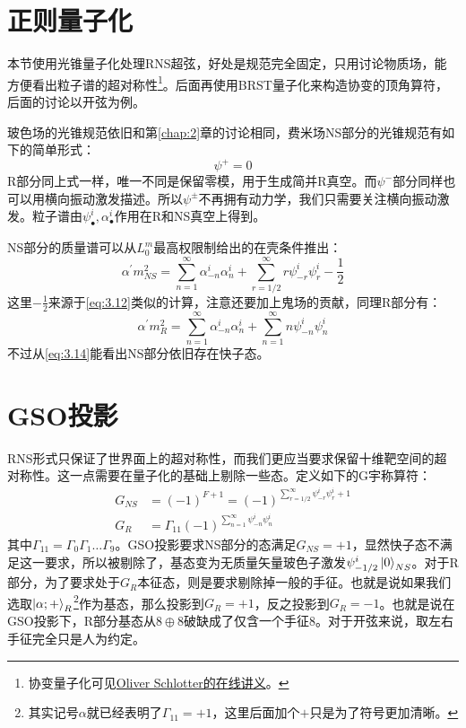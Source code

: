 \section{正则量子化}
本节使用光锥量子化处理RNS超弦，好处是规范完全固定，只用讨论物质场，能方便看出粒子谱的超对称性\footnote{协变量子化可见\href{https://www.uu.se/en/department/physics-and-astronomy/research/theoretical-physics/oliver-schlotterer}{Oliver Schlotter的在线讲义}。}。后面再使用BRST量子化来构造协变的顶角算符，后面的讨论以开弦为例。

玻色场的光锥规范依旧和第\ref{chap:2}章的讨论相同，费米场NS部分的光锥规范有如下的简单形式：
\begin{equation}
	\psi^+ = 0
\end{equation}
R部分同上式一样，唯一不同是保留零模，用于生成简并R真空。而$\psi^-$部分同样也可以用横向振动激发描述。所以$\psi^\pm$不再拥有动力学，我们只需要关注横向振动激发。粒子谱由$\psi^i_\bullet,\alpha^i_\bullet$作用在R和NS真空上得到。

NS部分的质量谱可以从$L_0^m$最高权限制给出的在壳条件推出：
\begin{equation}
	\label{eq:3.14}
	\alpha^{\prime}m^2_{NS}=\sum_{n=1}^\infty\alpha_{-n}^i\alpha_n^i+\sum_{r=1/2}^\infty r\psi_{-r}^i\psi_r^i-\frac{1}{2}
\end{equation}
这里$-\frac12$来源于\ref{eq:3.12}类似的计算，注意还要加上鬼场的贡献，同理R部分有：
\begin{equation}
	\alpha^{\prime}m^2_{R}=\sum_{n=1}^\infty\alpha_{-n}^i\alpha_n^i+\sum_{n=1}^\infty n\psi_{-n}^i \psi_n^i
\end{equation}
不过从\ref{eq:3.14}能看出NS部分依旧存在快子态。
\section{GSO投影}
RNS形式只保证了世界面上的超对称性，而我们更应当要求保留十维靶空间的超对称性。这一点需要在量子化的基础上剔除一些态。定义如下的G宇称算符：
\begin{equation}
\begin{aligned}
		G_{NS}&=(-1)^{F+1}=(-1)^{\sum_{r=1/2}^\infty \psi_{-r}^i\psi_r^i+1}\\
	G_R&=\Gamma_{11}(-1)^{\sum_{n=1}^\infty \psi_{-n}^i\psi_n^i}
\end{aligned}
\end{equation}
其中$\Gamma_{11}=\Gamma_{0}\Gamma_{1}\ldots\Gamma_{9}$。GSO投影要求NS部分的态满足$G_{NS}=+1$，显然快子态不满足这一要求，所以被剔除了，基态变为无质量矢量玻色子激发$\psi^i_{-1/2}\ket{0}_{NS}$。对于R部分，为了要求处于$G_R$本征态，则是要求剔除掉一般的手征。也就是说如果我们选取$\ket{\alpha;+}_R$\footnote{其实记号$\alpha$就已经表明了$\Gamma_{11}=+1$，这里后面加个$+$只是为了符号更加清晰。}作为基态，那么投影到$G_R=+1$，反之投影到$G_R=-1$。也就是说在GSO投影下，R部分基态从$8\oplus 8$破缺成了仅含一个手征$8$。对于开弦来说，取左右手征完全只是人为约定。

